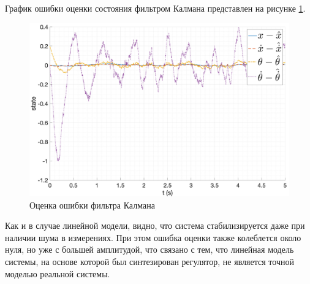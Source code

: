 График ошибки оценки состояния фильтром Калмана представлен на рисунке \ref{fig:lqgn_filter_err}. 
\begin{figure}[ht!]
    \centering
    \includegraphics[width=\textwidth]{media/plots/LQGn/observer_err_1.png}
    \caption{Оценка ошибки фильтра Калмана}
    \label{fig:lqgn_filter_err}
\end{figure}

Как и в случае линейной модели, видно, что система стабилизируется даже при наличии шума в измерениях. При этом ошибка 
оценки также колеблется около нуля, но уже с большей амплитудой, что связано с тем, что линейная модель 
системы, на основе которой был синтезирован регулятор, не является точной моделью реальной системы. 